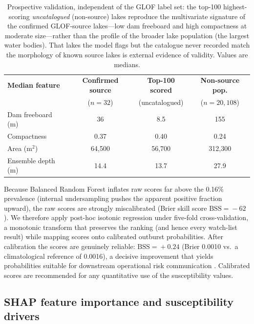 \documentclass[pdflatex,sn-basic]{sn-jnl}%
\begin{document}
\begin{table}[!t]
\caption{Prospective validation, independent of the GLOF label set: the
  top-100 highest-scoring \emph{uncatalogued} (non-source) lakes reproduce
  the multivariate signature of the confirmed GLOF-source lakes---low dam
  freeboard and high compactness at moderate size---rather than the profile
  of the broader lake population (the largest water bodies). That lakes the
  model flags but the catalogue never recorded match the morphology of
  known source lakes is external evidence of validity. Values are medians.}
\label{tab:prospective}
\centering
\begin{tabular*}{\textwidth}{@{\extracolsep{\fill}}lccc}
\toprule
\textbf{Median feature} & \textbf{Confirmed source}
  & \textbf{Top-100 scored} & \textbf{Non-source pop.} \\
 & ($n\!=\!32$) & (uncatalogued) & ($n\!=\!20{,}108$) \\
\midrule
Dam freeboard (m)   & 36 & 8.5 & 155 \\
Compactness         & 0.37 & 0.40 & 0.24 \\
Area (m$^2$)        & 64{,}500 & 56{,}700 & 312{,}300 \\
Ensemble depth (m)  & 14.4 & 13.7 & 27.9 \\
\bottomrule
\end{tabular*}
\end{table}

Because Balanced Random Forest inflates raw scores far above the
0.16\% prevalence (internal undersampling pushes the apparent positive
fraction upward), the raw scores are strongly miscalibrated
(Brier skill score $\text{BSS}\!=\!-62$). We therefore apply post-hoc
isotonic regression under five-fold cross-validation, a monotonic
transform that preserves the ranking (and hence every watch-list result)
while mapping scores onto calibrated outburst probabilities. After
calibration the scores are genuinely reliable: $\text{BSS}\!=\!+0.24$
(Brier 0.0010 vs.\ a climatological reference of 0.0016), a decisive
improvement that yields probabilities suitable for downstream operational
risk communication \citep{Niculescu2005}. Calibrated scores are
recommended for any quantitative use of the susceptibility values.

\subsection{SHAP feature importance and susceptibility drivers}
\end{document}
